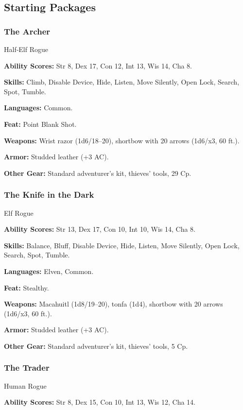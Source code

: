 \subsection{Starting Packages}
\subsubsection{The Archer}

Half‐Elf Rogue

\textbf{Ability Scores:} Str 8, Dex 17, Con 12, Int 13, Wis 14, Cha 8.

\textbf{Skills:} Climb, Disable Device, Hide, Listen, Move Silently, Open Lock, Search, Spot, Tumble.

\textbf{Languages:} Common.

\textbf{Feat:} Point Blank Shot.

\textbf{Weapons:} Wrist razor (1d6/18–20), shortbow with 20 arrows (1d6/x3, 60 ft.).

\textbf{Armor:} Studded leather (+3 AC).

\textbf{Other Gear:} Standard adventurer’s kit, thieves’ tools, 29 Cp.

\subsubsection{The Knife in the Dark}

Elf Rogue

\textbf{Ability Scores:} Str 13, Dex 17, Con 10, Int 10, Wis 14, Cha 8.

\textbf{Skills:} Balance, Bluff, Disable Device, Hide, Listen, Move Silently, Open Lock, Search, Spot, Tumble.

\textbf{Languages:} Elven, Common.

\textbf{Feat:} Stealthy.

\textbf{Weapons:} Macahuitl (1d8/19–20), tonfa (1d4), shortbow with 20 arrows (1d6/x3, 60 ft.).

\textbf{Armor:} Studded leather (+3 AC).

\textbf{Other Gear:} Standard adventurer’s kit, thieves’ tools, 5 Cp.

\subsubsection{The Trader}

Human Rogue

\textbf{Ability Scores:} Str 8, Dex 15, Con 10, Int 13, Wis 12, Cha 14.

